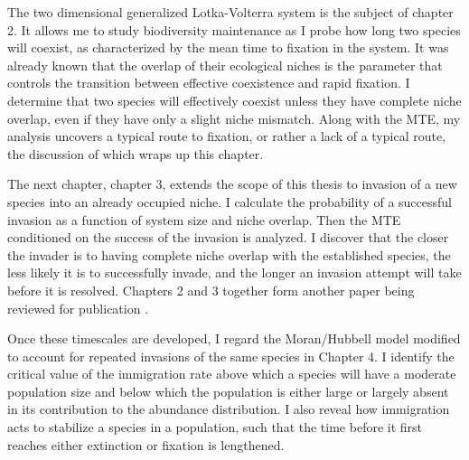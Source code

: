 The two dimensional generalized Lotka-Volterra system is the subject of chapter 2. 
It allows me to study biodiversity maintenance as I probe how long two species will coexist, as characterized by the mean time to fixation in the system. 
It was already known that the overlap of their ecological niches is the parameter that controls the transition between effective coexistence and rapid fixation. 
I determine that two species will effectively coexist unless they have complete niche overlap, even if they have only a slight niche mismatch. %
Along with the MTE, my analysis uncovers a typical route to fixation, or rather a lack of a typical route, the discussion of which wraps up this chapter. %

The next chapter, chapter 3, extends the scope of this thesis to invasion of a new species into an already occupied niche. %
I calculate the probability of a successful invasion as a function of system size and niche overlap. 
Then the MTE conditioned on the success of the invasion is analyzed. 
I discover that the closer the invader is to having complete niche overlap with the established species, the less likely it is to successfully invade, and the longer an invasion attempt will take before it is resolved. %
Chapters 2 and 3 together form another paper being reviewed for publication \cite{Badali2019a}. %

Once these timescales are developed, I regard the Moran/Hubbell model modified to account for repeated invasions of the same species in Chapter 4. %
I identify the critical value of the immigration rate above which a species will have a moderate population size and below which the population is either large or largely absent in its contribution to the abundance distribution. %
I also reveal how immigration acts to stabilize a species in a population, such that the time before it first reaches either extinction or fixation is lengthened. %

